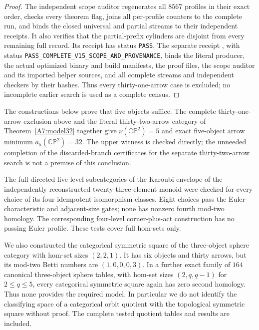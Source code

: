 \begin{proof}
The independent scope auditor regenerates all $8567$ profiles in
their exact order, checks every theorem flag, joins all per-profile
counters to the complete run, and binds the closed universal and
partial streams to their independent receipts. It also verifies
that the partial-prefix cylinders are disjoint from every remaining
full record. Its receipt
 has status
\texttt{PASS}. The separate receipt
, with status
\texttt{PASS\_COMPLETE\_V15\_SCOPE\_AND\_PROVENANCE}, binds the
literal producer, the actual optimized binary and build manifests,
the proof files, the scope auditor and its imported helper sources,
and all complete streams and independent checkers by their hashes.
Thus every thirty-one-arrow case is excluded; no incomplete earlier
search is used as a complete census.
\end{proof}

\begin{remark*}
The constructions below prove that five objects suffice.
The complete thirty-one-arrow exclusion above and the literal
thirty-two-arrow category of Theorem~\ref{A7:model32} together
give $\nu(\mathbb{CP}^2)=5$ and exact five-object arrow minimum
$a_5(\mathbb{CP}^2)=32$. The upper witness is checked directly;
the unneeded completion of the discarded-branch certificates
for the separate thirty-two-arrow search is not a premise of
this conclusion.
\end{remark*}

\begin{remark*}
The full directed five-level subcategories of the Karoubi envelope
of the independently reconstructed twenty-three-element monoid were
checked for every choice of its four idempotent isomorphism classes.
Eight choices pass the Euler-characteristic and adjacent-size gates;
none has nonzero fourth mod-two homology. The corresponding
four-level corner-plus-act construction has no passing Euler profile.
These tests cover full hom-sets only.

We also constructed the categorical symmetric square of the
three-object sphere category with hom-set sizes $(2,2,1)$.
It has six objects and thirty arrows, but its mod-two Betti numbers
are $(1,0,0,0,3)$. In a further exact family of $164$ canonical
three-object sphere tables, with hom-set sizes $(2,q,q-1)$ for
$2\le q\le5$, every categorical symmetric square again has zero
second homology. Thus none provides the required model. In
particular we do not identify the classifying space of a categorical
orbit quotient with the topological symmetric square without proof.
The complete tested quotient tables and results are included.
\end{remark*}

